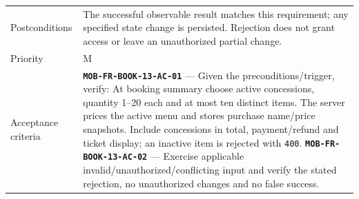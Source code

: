 \begin{longtable}{@{}P{0.23000\SRSWidth}P{0.77000\SRSWidth}@{}}
Postconditions & The successful observable result matches this requirement; any specified state change is persisted. Rejection does not grant access or leave an unauthorized partial change. \\[3pt]
Priority & M \\[3pt]
Acceptance criteria & \textbf{\texttt{MOB-\allowbreak{}FR-\allowbreak{}BOOK-\allowbreak{}13-\allowbreak{}AC-\allowbreak{}01}} — Given the preconditions/\allowbreak{}trigger, verify: At booking summary choose active concessions, quantity 1–20 each and at most ten distinct items. The server prices the active menu and stores purchase name/\allowbreak{}price snapshots. Include concessions in total, payment/\allowbreak{}refund and ticket display; an inactive item is rejected with \texttt{400}. \textbf{\texttt{MOB-\allowbreak{}FR-\allowbreak{}BOOK-\allowbreak{}13-\allowbreak{}AC-\allowbreak{}02}} — Exercise applicable invalid/\allowbreak{}unauthorized/\allowbreak{}conflicting input and verify the stated rejection, no unauthorized changes and no false success. \\[3pt]

\end{longtable}
